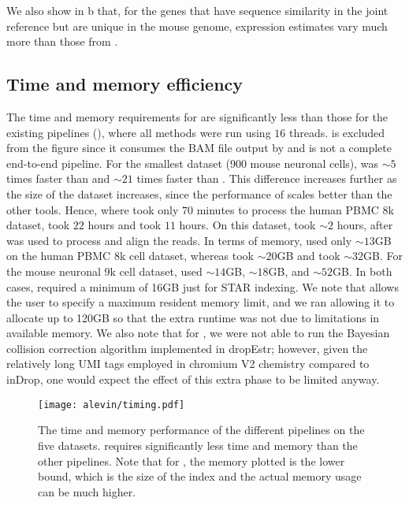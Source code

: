  We also show in b that, for the genes that have
  sequence similarity in the joint reference but are unique in the mouse genome,
  \cellr expression estimates vary much more than those from \alevin.

\subsection{Time and memory efficiency}
The time and memory requirements for \alevin are significantly less than those for the existing pipelines (), where all methods were run using $16$ threads. \dropest is excluded from the figure since it consumes the BAM file output by \cellr and is not a complete end-to-end pipeline. For the smallest dataset (900 mouse neuronal cells), \alevin was $\sim5$ times faster than \naive and $\sim21$ times faster than \cellr. This difference increases further as the size of the dataset increases, since the performance of \alevin scales better than the other tools. Hence, where \alevin took only $70$ minutes to process the human PBMC 8k dataset, \cellr took $22$ hours and \naive took $11$ hours. On this dataset, \dropest took $\sim2$ hours, after \cellr was used to process and align the reads. In terms of memory, \alevin used only $\sim13$GB on the human PBMC 8k cell dataset, whereas \naive took $\sim20$GB and \dropest took $\sim32$GB. For the mouse neuronal 9k cell dataset, \alevin used $\sim14$GB, \naive  $\sim18$GB, and \dropest $\sim52$GB. In both cases, \cellr required a minimum of 16GB just for STAR indexing. We note that \cellr allows the user to specify a maximum resident memory limit, and we ran \cellr allowing it to allocate up to 120GB so that the extra runtime was not due to limitations in available memory. We also note that for \dropest, we were not able to run the Bayesian collision correction algorithm implemented in dropEstr; however, given the relatively long UMI tags employed in chromium V2 chemistry compared to inDrop, one would expect the effect of this extra phase to be limited anyway.

\begin{figure}
    \centering
  \texttt{[image: alevin/timing.pdf]}
  \caption{The time and memory performance of the different pipelines on the five datasets. \Alevin requires significantly less time and memory than the other pipelines. Note that for \cellr, the memory plotted is the lower bound, which is the size of the index and the actual memory usage can be much higher.} %
  \label{fig:timemem}
\end{figure}


